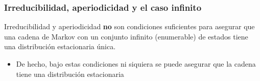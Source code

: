 %
%
%
%
%
%
%
%

\begin{frame}
\frametitle{Irreducibilidad, aperiodicidad y el caso infinito}

{\small

Irreducibilidad y aperiodicidad {\bf no} son condiciones suficientes para asegurar que una cadena de Markov con un conjunto infinito (enumerable) de estados tiene una distribución estacionaria única.
\begin{itemize}
\item De hecho, bajo estas condiciones ni siquiera se puede asegurar que la cadena tiene una distribución estacionaria
\end{itemize}



}

\end{frame}

